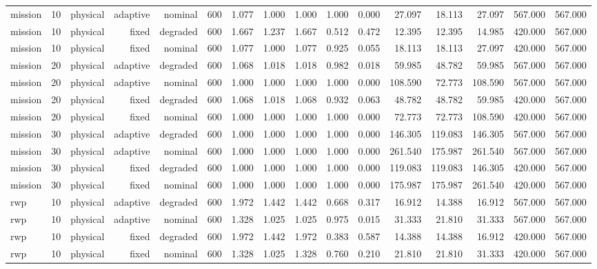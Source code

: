 \begin{tabular}{lrrrrrrrrrrrrrrr}
mission & 10 & physical & adaptive & nominal & 600 & 1.077 & 1.000 & 1.000 & 1.000 & 0.000 & 27.097 & 18.113 & 27.097 & 567.000 & 567.000 \\
mission & 10 & physical & fixed & degraded & 600 & 1.667 & 1.237 & 1.667 & 0.512 & 0.472 & 12.395 & 12.395 & 14.985 & 420.000 & 567.000 \\
mission & 10 & physical & fixed & nominal & 600 & 1.077 & 1.000 & 1.077 & 0.925 & 0.055 & 18.113 & 18.113 & 27.097 & 420.000 & 567.000 \\
mission & 20 & physical & adaptive & degraded & 600 & 1.068 & 1.018 & 1.018 & 0.982 & 0.018 & 59.985 & 48.782 & 59.985 & 567.000 & 567.000 \\
mission & 20 & physical & adaptive & nominal & 600 & 1.000 & 1.000 & 1.000 & 1.000 & 0.000 & 108.590 & 72.773 & 108.590 & 567.000 & 567.000 \\
mission & 20 & physical & fixed & degraded & 600 & 1.068 & 1.018 & 1.068 & 0.932 & 0.063 & 48.782 & 48.782 & 59.985 & 420.000 & 567.000 \\
mission & 20 & physical & fixed & nominal & 600 & 1.000 & 1.000 & 1.000 & 1.000 & 0.000 & 72.773 & 72.773 & 108.590 & 420.000 & 567.000 \\
mission & 30 & physical & adaptive & degraded & 600 & 1.000 & 1.000 & 1.000 & 1.000 & 0.000 & 146.305 & 119.083 & 146.305 & 567.000 & 567.000 \\
mission & 30 & physical & adaptive & nominal & 600 & 1.000 & 1.000 & 1.000 & 1.000 & 0.000 & 261.540 & 175.987 & 261.540 & 567.000 & 567.000 \\
mission & 30 & physical & fixed & degraded & 600 & 1.000 & 1.000 & 1.000 & 1.000 & 0.000 & 119.083 & 119.083 & 146.305 & 420.000 & 567.000 \\
mission & 30 & physical & fixed & nominal & 600 & 1.000 & 1.000 & 1.000 & 1.000 & 0.000 & 175.987 & 175.987 & 261.540 & 420.000 & 567.000 \\
rwp & 10 & physical & adaptive & degraded & 600 & 1.972 & 1.442 & 1.442 & 0.668 & 0.317 & 16.912 & 14.388 & 16.912 & 567.000 & 567.000 \\
rwp & 10 & physical & adaptive & nominal & 600 & 1.328 & 1.025 & 1.025 & 0.975 & 0.015 & 31.333 & 21.810 & 31.333 & 567.000 & 567.000 \\
rwp & 10 & physical & fixed & degraded & 600 & 1.972 & 1.442 & 1.972 & 0.383 & 0.587 & 14.388 & 14.388 & 16.912 & 420.000 & 567.000 \\
rwp & 10 & physical & fixed & nominal & 600 & 1.328 & 1.025 & 1.328 & 0.760 & 0.210 & 21.810 & 21.810 & 31.333 & 420.000 & 567.000 \\

\end{tabular}
